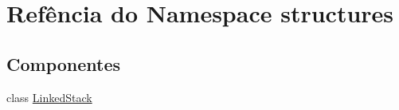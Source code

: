 \hypertarget{namespacestructures}{}\section{Refência do Namespace structures}
\label{namespacestructures}
\subsection*{Componentes}
\begin{DoxyCompactItemize}
\item 
class \mbox{\hyperlink{classstructures_1_1LinkedStack}{Linked\+Stack}}
\end{DoxyCompactItemize}
